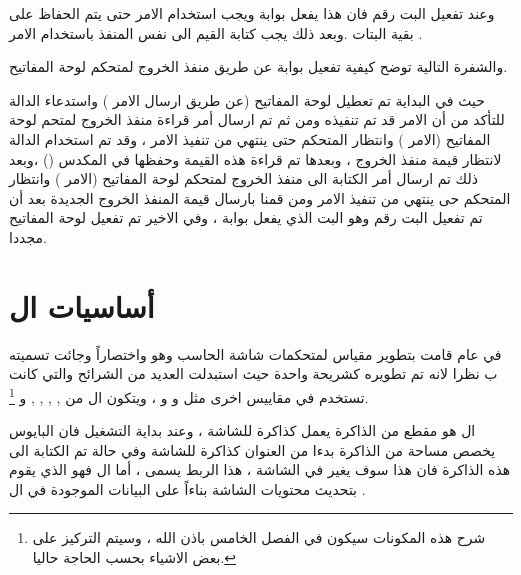 \documentclass[document.tex]{subfiles}
\begin{document}
وعند تفعيل البت رقم  فان هذا يفعل بوابة  ويجب استخدام الامر  حتى يتم الحفاظ على بقية البتات .وبعد ذلك يجب كتابة القيم الى نفس المنفذ باستخدام الامر  .

والشفرة التالية توضح كيفية تفعيل بوابة  عن طريق منفذ الخروج  لمتحكم لوحة المفاتيح.

\begin{english}
\lstset{numberstyle=\tiny,numbersep=5pt,tabsize=2,extendedchars=true,breaklines=true,frame=b,showspaces=false, showtabs=false,xleftmargin=10pt,framexleftmargin=10pt,framexrightmargin=5pt,framexbottommargin=4pt,showstringspaces=false,language=[x86masm]Assembler}


\end{english}

حيث في البداية تم تعطيل لوحة المفاتيح (عن طريق ارسال الامر ) واستدعاء الدالة  للتأكد من أن الامر قد تم تنفيذه ومن ثم تم ارسال أمر قراءة منفذ الخروج لمتحم لوحة المفاتيح (الامر ) وانتظار المتحكم حتى ينتهي من تنفيذ الامر ، وقد تم استخدام الدالة  لانتظار قيمة منفذ الخروج ، وبعدها تم قراءة هذه القيمة وحفظها في المكدس () ،وبعد ذلك تم ارسال أمر الكتابة الى منفذ الخروج لمتحكم لوحة المفاتيح (الامر ) وانتظار المتحكم حى ينتهي من تنفيذ الامر ومن قمنا بارسال قيمة المنفذ الخروج الجديدة بعد أن تم تفعيل البت رقم  وهو البت الذي يفعل بوابة  ، وفي الاخير تم تفعيل لوحة المفاتيح مجددا.
 

\section{أساسيات ال }
في عام  قامت  بتطوير مقياس لمتحكمات شاشة الحاسب وهو  واختصاراً  وجائت تسميته ب  نظرا لانه تم تطويره كشريحة واحدة  حيث استبدلت العديد من الشرائح والتي كانت تستخدم في مقاييس اخرى مثل  و  و  ، ويتكون ال  من ,  ,  ,  ,  و \footnote{شرح هذه المكونات سيكون في الفصل الخامس باذن الله ، وسيتم التركيز على بعض الاشياء بحسب الحاجة حاليا.}.

ال  هو مقطع من الذاكرة  يعمل كذاكرة للشاشة  ، وعند بداية التشغيل فان البايوس يخصص مساحة من الذاكرة بدءا من العنوان  كذاكرة للشاشة وفي حالة تم الكتابة الى هذه الذاكرة فان هذا سوف يغير في الشاشة ، هذا الربط يسمى ، أما ال  فهو الذي يقوم بتحديث محتويات الشاشة بناءاً على البيانات الموجودة في ال .
 
\end{document}
